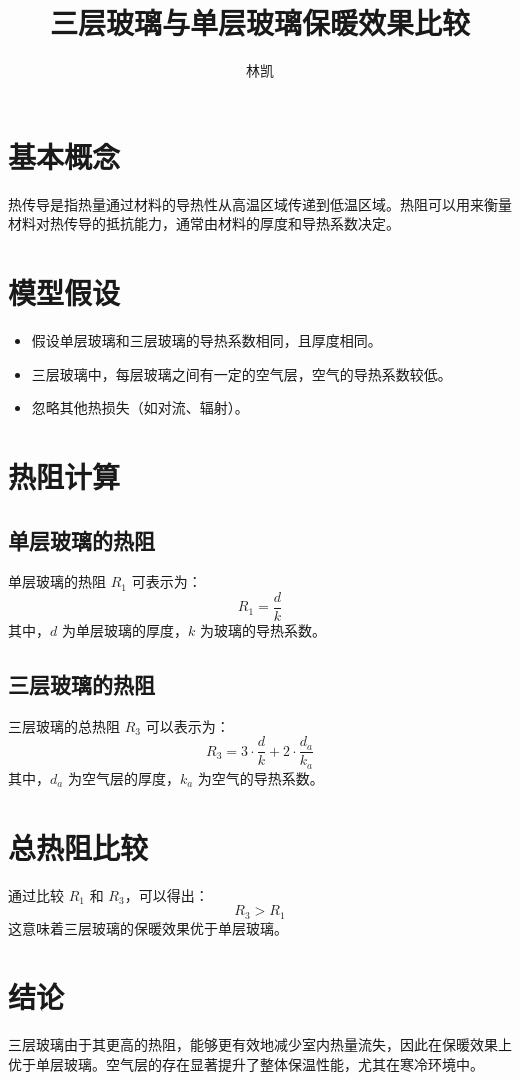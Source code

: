 \documentclass{article}
\begin{document}
\title{三层玻璃与单层玻璃保暖效果比较}
\author{林凯}
\date{}
\maketitle

\section{基本概念}

热传导是指热量通过材料的导热性从高温区域传递到低温区域。热阻可以用来衡量材料对热传导的抵抗能力，通常由材料的厚度和导热系数决定。

\section{模型假设}

\begin{itemize}
    \item 假设单层玻璃和三层玻璃的导热系数相同，且厚度相同。
    \item 三层玻璃中，每层玻璃之间有一定的空气层，空气的导热系数较低。
    \item 忽略其他热损失（如对流、辐射）。
\end{itemize}

\section{热阻计算}

\subsection{单层玻璃的热阻}

单层玻璃的热阻 \( R_1 \) 可表示为：
\[
R_1 = \frac{d}{k}
\]
其中，\( d \) 为单层玻璃的厚度，\( k \) 为玻璃的导热系数。

\subsection{三层玻璃的热阻}

三层玻璃的总热阻 \( R_3 \) 可以表示为：
\[
R_3 = 3 \cdot \frac{d}{k} + 2 \cdot \frac{d_a}{k_a}
\]
其中，\( d_a \) 为空气层的厚度，\( k_a \) 为空气的导热系数。

\section{总热阻比较}

通过比较 \( R_1 \) 和 \( R_3 \)，可以得出：
\[
R_3 > R_1
\]
这意味着三层玻璃的保暖效果优于单层玻璃。

\section{结论}

三层玻璃由于其更高的热阻，能够更有效地减少室内热量流失，因此在保暖效果上优于单层玻璃。空气层的存在显著提升了整体保温性能，尤其在寒冷环境中。
\end{document}
